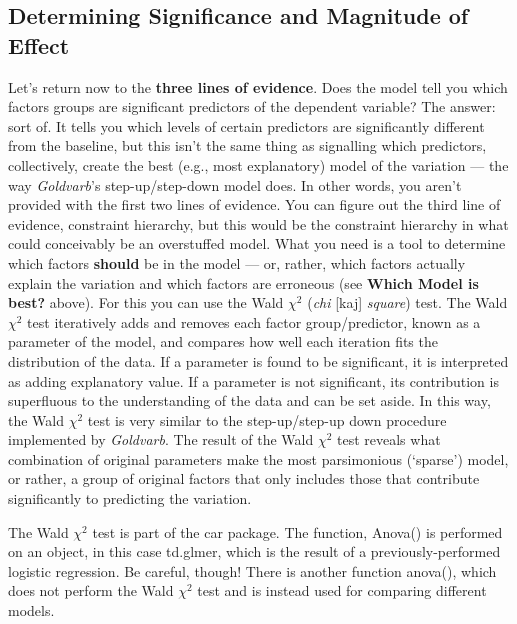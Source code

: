 \documentclass[
  10pt,
  letterpaper]{article}
\renewcommand\texttt[1]{{\ttfamily\color{BrickRed}#1}}
\begin{document}
\hypertarget{determining-significance-and-magnitude-of-effect}{%
\subsection{Determining Significance and Magnitude of
Effect}\label{determining-significance-and-magnitude-of-effect}}

Let's return now to the \textbf{three lines of evidence}. Does the model
tell you which factors groups are significant predictors of the
dependent variable? The answer: sort of. It tells you which levels of
certain predictors are significantly different from the baseline, but
this isn't the same thing as signalling which predictors, collectively,
create the best (e.g., most explanatory) model of the variation --- the
way \emph{Goldvarb}'s step-up/step-down model does. In other words, you
aren't provided with the first two lines of evidence. You can figure out
the third line of evidence, constraint hierarchy, but this would be the
constraint hierarchy in what could conceivably be an overstuffed model.
What you need is a tool to determine which factors \textbf{should} be in
the model --- or, rather, which factors actually explain the variation
and which factors are erroneous (see \textbf{Which Model is best?}
above). For this you can use the Wald \(\chi^2\) (\emph{chi} {[}kaj{]}
\emph{square}) test. The Wald \(\chi^2\) test iteratively adds and
removes each factor group/predictor, known as a parameter of the model,
and compares how well each iteration fits the distribution of the data.
If a parameter is found to be significant, it is interpreted as adding
explanatory value. If a parameter is not significant, its contribution
is superfluous to the understanding of the data and can be set aside. In
this way, the Wald \(\chi^2\) test is very similar to the
step-up/step-up down procedure implemented by \emph{Goldvarb}. The
result of the Wald \(\chi^2\) test reveals what combination of original
parameters make the most parsimonious (`sparse') model, or rather, a
group of original factors that only includes those that contribute
significantly to predicting the variation.

The Wald \(\chi^2\) test is part of the \texttt{car} package. The
function, \texttt{Anova()} is performed on an object, in this case
\texttt{td.glmer}, which is the result of a previously-performed
logistic regression. Be careful, though! There is another function
\texttt{anova()}, which does not perform the Wald \(\chi^2\) test and is
instead used for comparing different models.
\end{document}
